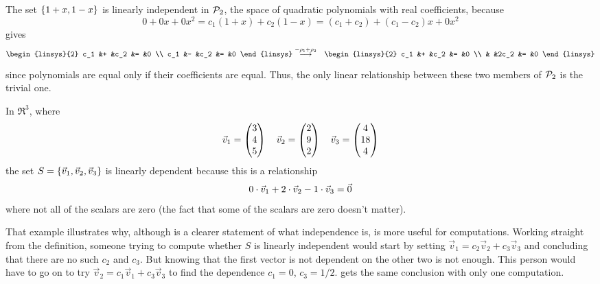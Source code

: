 \begin{example}
The set \( \mbox{$\{1+x,1-x\}$} \) is linearly independent in \( \mathcal{P}_2 \), the
space of quadratic polynomials with real coefficients, because
\begin{equation*}
   0+0x+0x^2
   =
   c_1(1+x)+c_2(1-x)
   =
   (c_1+c_2)+(c_1-c_2)x+0x^2
\end{equation*}
gives 
\begin{eqnarray*}
  \begin{linsys}{2}
    c_1  &+  &c_2  &=  &0  \\
    c_1  &-  &c_2  &=  &0  
   \end{linsys}
  &\grstep{-\rho_1+\rho_2}
  &\begin{linsys}{2}
     c_1  &+  &c_2  &=  &0  \\
          &   &2c_2 &=  &0
  \end{linsys}
\end{eqnarray*}
since polynomials are equal only if their coefficients are equal.
Thus, the only linear relationship between these two members of
$\mathcal{P}_2$ is the trivial one.
\end{example}

\begin{example}
In \( \Re^3 \), where
\begin{equation*}
   \vec{v}_1=\begin{pmatrix} 3 \\ 4 \\ 5 \end{pmatrix}
   \quad
   \vec{v}_2=\begin{pmatrix} 2 \\ 9 \\ 2 \end{pmatrix}
   \quad
   \vec{v}_3=\begin{pmatrix} 4 \\ 18 \\ 4 \end{pmatrix}
\end{equation*}
the set \( S=\mbox{$\{\vec{v}_1,\vec{v}_2,\vec{v}_3\}$} \)
is linearly dependent because this is a relationship
\begin{equation*}
  0\cdot\vec{v}_1
  +2\cdot\vec{v}_2
  -1\cdot\vec{v}_3
  =\vec{0}
\end{equation*}
where not all of the scalars are zero (the fact that some 
of the scalars are zero doesn't matter).
\end{example}

\begin{remark}  \label{rem:WhyLIIsNonTrivLinRel}
That example illustrates why, 
although  is a clearer
statement of what independence is,
 is more useful for
computations.
Working straight from the definition, someone trying to compute whether $S$
is linearly independent would start by setting
\( \vec{v}_1=c_2\vec{v}_2+c_3\vec{v}_3 \)
and concluding that there are no such $c_2$ and $c_3$.
But knowing that the first vector is not
dependent on the other two is not enough.
This person would have to go on to try
\( \vec{v}_2=c_1\vec{v}_1+c_3\vec{v}_3 \) 
to find the dependence $c_1=0$, \( c_3=1/2 \).
gets the same conclusion with only one computation.
\end{remark}

